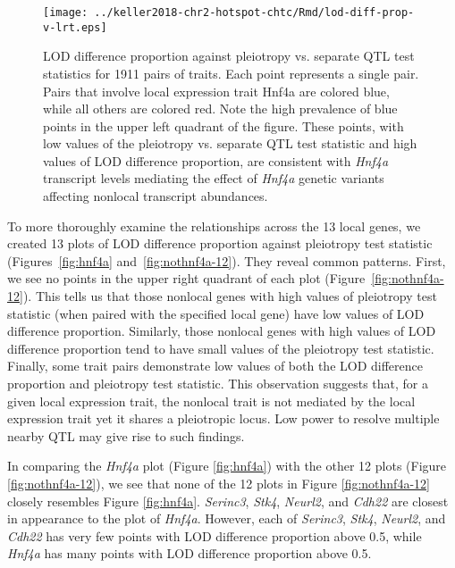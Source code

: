 \documentclass[oneside]{book}
\begin{document}
\begin{figure}
    \centering
    \texttt{[image: ../keller2018-chr2-hotspot-chtc/Rmd/lod-diff-prop-v-lrt.eps]}
    \caption[LOD difference proportion vs. pleiotropy test statistic]{LOD difference proportion against pleiotropy vs. separate QTL test statistics for 1911 pairs of traits. Each point represents a single pair. Pairs that involve local expression trait Hnf4a are colored blue, while all others are colored red. Note the high prevalence of blue points in the upper left quadrant of the figure. These points, with low values of the pleiotropy vs. separate QTL test statistic and high values of LOD difference proportion, are consistent with \emph{Hnf4a} transcript levels mediating the effect of \emph{Hnf4a} genetic variants affecting nonlocal transcript abundances.}
    \label{fig:lod-diff-prop-v-lrt-all}
\end{figure}


To more thoroughly examine the relationships across the 13 local genes, we created 13 plots of LOD difference proportion against pleiotropy test statistic (Figures~\ref{fig:hnf4a} and~\ref{fig:nothnf4a-12}). They reveal common patterns. First, we see no points in the upper right quadrant of each plot (Figure~\ref{fig:nothnf4a-12}). This tells us that those nonlocal genes with high values of pleiotropy test statistic (when paired with the specified local gene) have low values of LOD difference proportion. Similarly, those nonlocal genes with high values of LOD difference proportion tend to have small values of the pleiotropy test statistic. Finally, some trait pairs demonstrate low values of both the LOD difference proportion and pleiotropy test statistic. This observation suggests that, for a given local expression trait, the nonlocal trait is not mediated by the local expression trait yet it shares a pleiotropic locus. Low power to resolve multiple nearby QTL may give rise to such findings.

In comparing the \emph{Hnf4a} plot (Figure \ref{fig:hnf4a}) with the other 12 plots (Figure \ref{fig:nothnf4a-12}), we see that none of the 12 plots in Figure \ref{fig:nothnf4a-12} closely resembles Figure \ref{fig:hnf4a}. \emph{Serinc3}, \emph{Stk4}, \emph{Neurl2}, and \emph{Cdh22} are closest in appearance to the plot of \emph{Hnf4a}. However, each of \emph{Serinc3}, \emph{Stk4}, \emph{Neurl2}, and \emph{Cdh22} has very few points with LOD difference proportion above 0.5, while \emph{Hnf4a} has many points with LOD difference proportion above 0.5.
\end{document}
